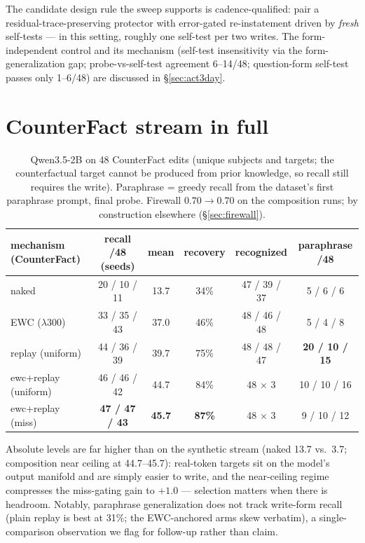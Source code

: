 \documentclass[11pt]{article}
\newcommand{\qwen}{Qwen3.5-2B}
\begin{document}
The candidate design rule the sweep supports is cadence-qualified: pair a
residual-trace-preserving protector with error-gated re-instatement driven by \emph{fresh}
self-tests --- in this setting, roughly one self-test per two writes. The form-independent
control and its mechanism (self-test insensitivity via the form-generalization gap;
probe-vs-self-test agreement 6--14/48; question-form self-test passes only 1--6/48) are
discussed in \S\ref{sec:act3day}.

\section{CounterFact stream in full}\label{app:cf}

\begin{table}[h]
\centering\small
\begin{tabular}{lccccc}
\toprule
mechanism (CounterFact) & recall /48 (seeds) & mean & recovery & recognized & paraphrase /48 \\
\midrule
naked            & 20 / 10 / 11 & 13.7 & 34\% & 47 / 39 / 37 & 5 / 6 / 6 \\
EWC ($\lambda$300) & 33 / 35 / 43 & 37.0 & 46\% & 48 / 46 / 48 & 5 / 4 / 8 \\
replay (uniform) & 44 / 36 / 39 & 39.7 & 75\% & 48 / 48 / 47 & \textbf{20 / 10 / 15} \\
ewc+replay (uniform) & 46 / 46 / 42 & 44.7 & 84\% & 48 $\times$ 3 & 10 / 10 / 16 \\
ewc+replay (miss) & \textbf{47 / 47 / 43} & \textbf{45.7} & \textbf{87\%} & 48 $\times$ 3 & 9 / 10 / 12 \\
\bottomrule
\end{tabular}
\caption{\qwen{} on 48 CounterFact edits (unique subjects and targets; the counterfactual target
cannot be produced from prior knowledge, so recall still requires the write). Paraphrase =
greedy recall from the dataset's first paraphrase prompt, final probe. Firewall $0.70 \to 0.70$
on the composition runs; by construction elsewhere (\S\ref{sec:firewall}).}
\label{tab:cf}
\end{table}

Absolute levels are far higher than on the synthetic stream (naked 13.7 vs.\ 3.7; composition
near ceiling at 44.7--45.7): real-token targets sit on the model's output manifold and are
simply easier to write, and the near-ceiling regime compresses the miss-gating gain to $+1.0$
--- selection matters when there is headroom. Notably, paraphrase generalization does not track
write-form recall (plain replay is best at 31\%; the EWC-anchored arms skew verbatim), a
single-comparison observation we flag for follow-up rather than claim.
\end{document}
